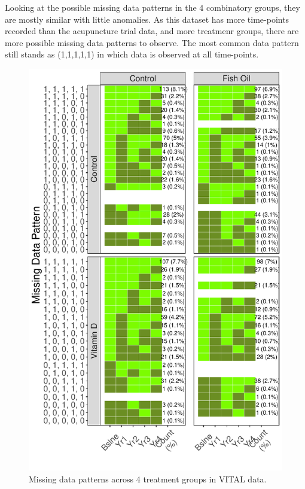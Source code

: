 \documentclass{article}
\newcommand{\pandocbounded}[1]{#1}
\begin{document}
Looking at the possible missing data patterns in the 4 combinatory
groups, they are mostly similar with little anomalies. As this dataset
has more time-points recorded than the acupuncture trial data, and more
treatmenr groups, there are more possible missing data patterns to
observe. The most common data pattern still stands as (1,1,1,1,1) in
which data is observed at all time-points.

\begin{figure}
\centering
\pandocbounded{\includegraphics[keepaspectratio]{Final_Report_files/figure-latex/unnamed-chunk-29-1.pdf}}
\caption{Missing data patterns across 4 treatment groups in VITAL data.}
\end{figure}
\end{document}
